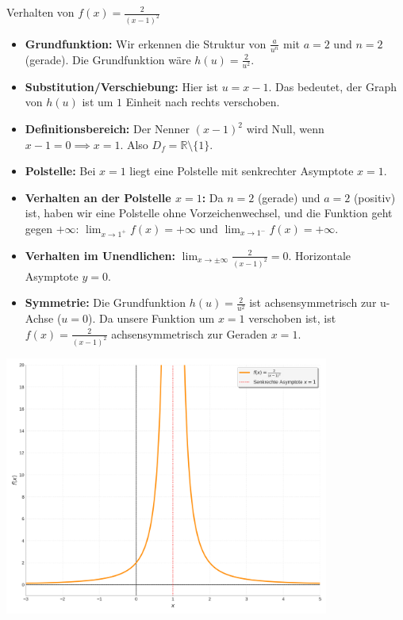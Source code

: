 \begin{beispielumgebung}{Verhalten von $f(x) = \frac{2}{(x-1)^2}$}
\begin{itemize}
    \item \textbf{Grundfunktion:} Wir erkennen die Struktur von $\frac{a}{u^n}$ mit $a=2$ und $n=2$ (gerade). Die Grundfunktion wäre $h(u) = \frac{2}{u^2}$.
    \item \textbf{Substitution/Verschiebung:} Hier ist $u = x-1$. Das bedeutet, der Graph von $h(u)$ ist um $1$ Einheit nach rechts verschoben.
    \item \textbf{Definitionsbereich:} Der Nenner $(x-1)^2$ wird Null, wenn $x-1=0 \implies x=1$. Also $D_f = \mathbb{R} \setminus \{1\}$.
    \item \textbf{Polstelle:} Bei $x=1$ liegt eine Polstelle mit senkrechter Asymptote $x=1$.
    \item \textbf{Verhalten an der Polstelle $x=1$:} Da $n=2$ (gerade) und $a=2$ (positiv) ist, haben wir eine Polstelle ohne Vorzeichenwechsel, und die Funktion geht gegen $+\infty$:
        $\lim_{x \to 1^+} f(x) = +\infty$ und $\lim_{x \to 1^-} f(x) = +\infty$.
    \item \textbf{Verhalten im Unendlichen:} $\lim_{x \to \pm\infty} \frac{2}{(x-1)^2} = 0$. Horizontale Asymptote $y=0$.
    \item \textbf{Symmetrie:} Die Grundfunktion $h(u)=\frac{2}{u^2}$ ist achsensymmetrisch zur u-Achse ($u=0$). Da unsere Funktion um $x=1$ verschoben ist, ist $f(x)=\frac{2}{(x-1)^2}$ achsensymmetrisch zur Geraden $x=1$.
\end{itemize}
\begin{center}
    \includegraphics[width=0.8\textwidth]{grafiken/Gebrochen_Rational_Verschoben.png}
    \label{fig:gebr_rat_verschoben}
\end{center}
\end{beispielumgebung}

